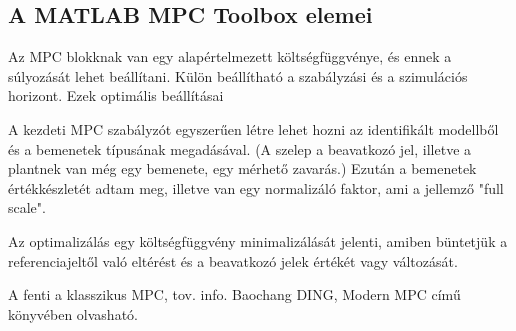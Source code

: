 



\subsection{A MATLAB MPC Toolbox elemei}
Az MPC blokknak van egy alapértelmezett költségfüggvénye, és ennek a súlyozását lehet beállítani.
Külön beállítható a szabályzási és a szimulációs horizont.
Ezek optimális beállításai 

A kezdeti MPC szabályzót egyszerűen létre lehet hozni az identifikált modellből és a bemenetek típusának megadásával. (A szelep a beavatkozó jel, illetve a plantnek van még egy bemenete, egy mérhető zavarás.) Ezután a bemenetek értékkészletét adtam meg, illetve van egy normalizáló faktor, ami a jellemző "full scale".

Az optimalizálás egy költségfüggvény minimalizálását jelenti, amiben büntetjük a referenciajeltől való eltérést és a beavatkozó jelek értékét vagy változását.

A fenti a klasszikus MPC, tov. info. Baochang DING, Modern MPC című könyvében olvasható.


